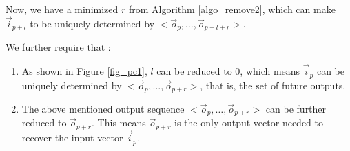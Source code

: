 \documentclass[twocolumn]{article}
\begin{document}
% 
% 

Now, 
we have a minimized $r$ from Algorithm \ref{algo_remove2},
which can make $\vec{i}_{p+l}$ to be uniquely determined by $<\vec{o}_{p},\dots,\vec{o}_{p+l+r}>$.

We further require that :
\begin{enumerate}
 \item As shown in Figure \ref{fig_pc1},
 $l$ can be reduced to 0,
 which means $\vec{i}_{p}$ can be uniquely determined by $<\vec{o}_{p},\dots,\vec{o}_{p+r}>$,
 that is,
 the set of future outputs.
 \item The above mentioned output sequence $<\vec{o}_{p},\dots,\vec{o}_{p+r}>$ 
 can be further reduced to $\vec{o}_{p+r}$.
 This means $\vec{o}_{p+r}$ is the only output vector needed to recover the input vector $\vec{i}_p$.
\end{enumerate}
\end{document}
